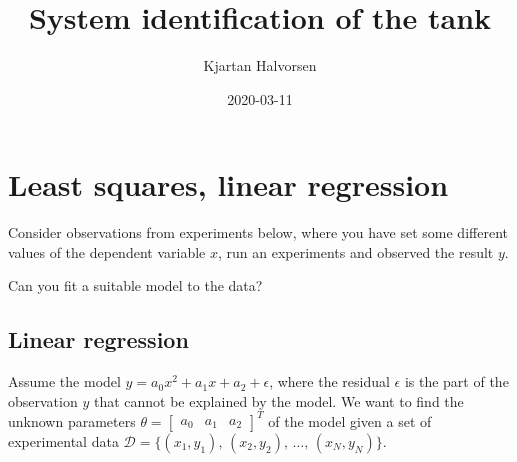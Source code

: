 \documentclass[a4paper]{scrartcl}
\author{Kjartan Halvorsen}
\date{2020-03-11}
\title{System identification of the tank}
\begin{document}
\maketitle

\section{Least squares, linear regression}
\label{sec:orgbed202b}

Consider observations from experiments below, where you have set some different values of the dependent variable  \(x\), run an experiments and observed the result \(y\).

  \begin{center}
\end{center}

Can you fit a suitable model to the data?

\subsection{Linear regression}
\label{sec:org21b8a5d}
Assume the model \(y = a_0x^2 + a_1x + a_2 + \epsilon\), where the residual \(\epsilon\) is the part of the observation \(y\) that cannot be explained by the model. We want to find the unknown parameters \(\theta = \begin{bmatrix} a_0 & a_1 & a_2\end{bmatrix}^T\) of the model given a set of experimental data \(\mathcal{D} = \{ (x_1, y_1),\, (x_2, y_2),\, \ldots, \, (x_N, y_N) \}\).
\end{document}
